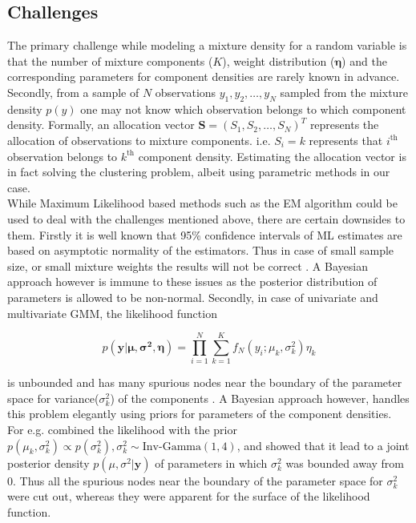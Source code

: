 \subsection{Challenges}
\label{subsec : challenges_mixture_density}
The primary challenge while modeling a mixture density for a random variable is that the number of mixture components ($K$), weight distribution ($\boldsymbol{\eta}$) and the corresponding parameters for component densities are rarely known in advance. Secondly, from a sample of $N$ observations $y_1, y_2, \ldots, y_N$ sampled from the mixture density $p(y)$ one may not know which observation belongs to which component density. Formally, an allocation vector $\boldsymbol{S} = (S_1, S_2, \ldots, S_N)^T$ represents the allocation of observations to mixture components. i.e. $S_i = k$ represents that $i^\text{th}$ observation belongs to $k^\text{th}$ component density. Estimating the allocation vector is in fact solving the clustering problem, albeit using parametric methods in our case.\\

While Maximum Likelihood based methods such as the EM algorithm could be used to deal with the challenges mentioned above, there are certain downsides to them. Firstly it is well known that 95\% confidence intervals of ML estimates are based on asymptotic normality of the estimators. Thus in case of small sample size, or small mixture weights the results will not be correct \citep[pg. 35]{fruhwirth-schnatter_finite_2013}. A Bayesian approach however is immune to these issues as the posterior distribution of parameters is allowed to be non-normal. Secondly, in case of univariate and multivariate GMM, the likelihood function

$$ p(\boldsymbol{y}|\boldsymbol{\mu}, \boldsymbol{\sigma^2}, \boldsymbol{\eta}) = \prod_{i=1}^{N} \sum_{k=1}^{K} f_N(y_i; \mu_k, \sigma^2_k) \eta_k$$

is unbounded and has many spurious nodes near the boundary of the parameter space for variance($\sigma^2_k$) of the components \citep{kiefer_consistency_1956,day_estimating_1969}. A Bayesian approach however, handles this problem elegantly using priors for parameters of the component densities. For e.g. \citet[pg. 176]{fruhwirth-schnatter_finite_2013} combined the likelihood with the prior $p(\mu_k, \sigma^2_k) \propto p(\sigma^2_k), \sigma^2_k\sim \text{Inv-Gamma}(1,4)$, and showed that it lead to a joint posterior density $p(\mu, \sigma^2 | \boldsymbol{y})$ of parameters in which $\sigma^2_k$ was bounded away from 0. Thus all the spurious nodes near the boundary of the parameter space for $\sigma^2_k$ were cut out, whereas they were apparent for the surface of the likelihood function.

